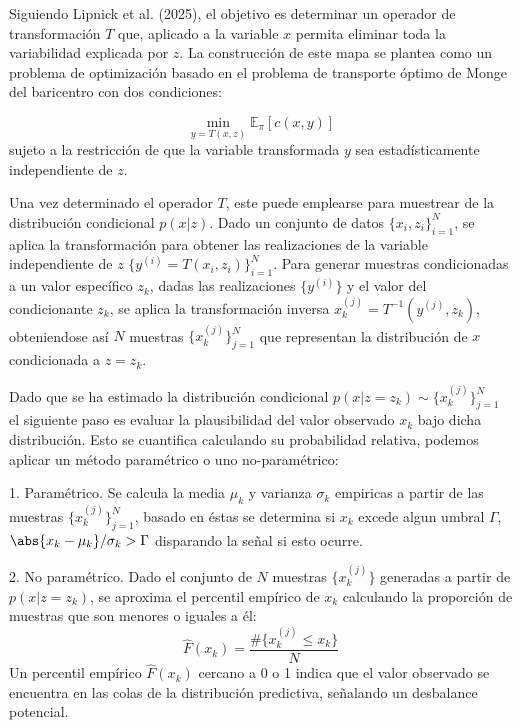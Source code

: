 \documentclass{myarticle}
\begin{document}
Siguiendo Lipnick et al. (2025), el objetivo es determinar un operador de transformación \( T \) que, aplicado a la variable \( x \) permita eliminar toda la variabilidad explicada por \( z \). La construcción de este mapa se plantea como un problema de optimización basado en el problema de transporte óptimo de Monge del baricentro  con dos condiciones:

\[
\min_{y = T(x,z)} \mathbb{E}_{\pi} \left[ c(x, y) \right]
\]
sujeto a la restricción de que la variable transformada \( y \) sea estadísticamente independiente de \( z \).


Una vez determinado el operador \( T \), este puede emplearse para muestrear de la distribución condicional \( p(x | z) \). Dado un conjunto de datos \( \{x_i, z_i\}_{i=1}^N \), se aplica la transformación para obtener las realizaciones de la variable independiente de $z$ \( \{ y^{(i)} = T(x_i, z_i)\}_{i=1}^N \). Para generar muestras condicionadas a un valor específico \( z_k \), dadas las realizaciones \( \{y^{(i)}\} \) y el valor del condicionante \( z_k \), se aplica la transformación inversa \( x_k^{(j)} = T^{-1}(y^{(j)}, z_k) \), obteniendose así \( N \) muestras \( \{x_k^{(j)}\}_{j=1}^N \) que representan la distribución de \( x \) condicionada a \( z = z_k \).

Dado que se ha estimado la distribución condicional $p(x|z=z_k)\sim \{x_k^{(j)}\}_{j=1}^N$ el siguiente paso es evaluar la plausibilidad del valor observado $x_k$ bajo dicha distribución. Esto se cuantifica calculando su probabilidad relativa, podemos aplicar un método paramétrico o uno no-paramétrico:


1.  Param\'etrico. Se calcula la media $\mu_k$ y varianza $\sigma_k$ empiricas a partir de las muestras $\{x_k^{(j)}\}_{j=1}^N$, basado en \'estas se determina si $x_k$ excede algun umbral $\Gamma$, $\abs{x_k-\mu_k}/\sigma_k > \Gamma$ disparando la se\~nal si esto ocurre.

2. No param\'etrico. Dado el conjunto de \( N \) muestras \( \{x_k^{(j)}\} \) generadas a partir de \( p(x | z = z_k) \), se  aproxima el percentil empírico de \( x_k \) calculando la proporción de muestras que son menores o iguales a él:
    \[
    \hat{F}(x_k) = \frac{ \#\{ x_k^{(j)} \leq x_k \} }{N}
    \]
    Un percentil empírico \( \hat{F}(x_k) \) cercano a 0 o 1 indica que el valor observado se encuentra en las colas de la distribución predictiva, señalando un desbalance potencial.
\end{document}

